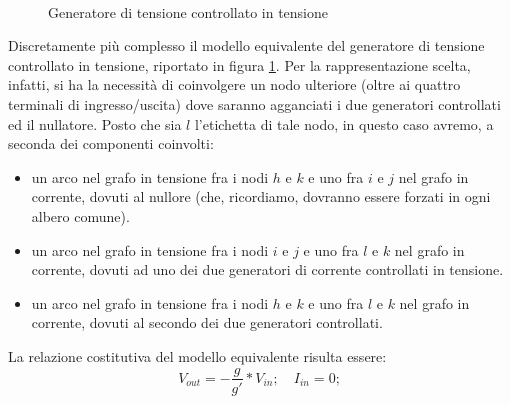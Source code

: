 \begin{figure}[t]
 \centering
 \\
 \caption{Generatore di tensione controllato in tensione}
 \label{fig:vcvscmp}
\end{figure}

Discretamente più complesso il modello equivalente del generatore di tensione controllato in tensione, riportato in figura \ref{fig:vcvscmp}. Per la rappresentazione scelta, infatti, si ha la necessità di coinvolgere un nodo ulteriore (oltre ai quattro terminali di ingresso/uscita) dove saranno agganciati i due generatori controllati ed il nullatore. Posto che sia $l$ l'etichetta di tale nodo, in questo caso avremo, a seconda dei componenti coinvolti:
\begin{itemize}
 \item un arco nel grafo in tensione fra i nodi $h$ e $k$ e uno fra $i$ e $j$ nel grafo in corrente, dovuti al nullore (che, ricordiamo, dovranno essere forzati in ogni albero comune).
 \item un arco nel grafo in tensione fra i nodi $i$ e $j$ e uno fra $l$ e $k$ nel grafo in corrente, dovuti ad uno dei due generatori di corrente controllati in tensione.
 \item un arco nel grafo in tensione fra i nodi $h$ e $k$ e uno fra $l$ e $k$ nel grafo in corrente, dovuti al secondo dei due generatori controllati.
\end{itemize}
La relazione costitutiva del modello equivalente risulta essere:
$$ V_{out} = -\frac{g}{g'}\ast V_{in};\quad I_ {in} = 0; $$

